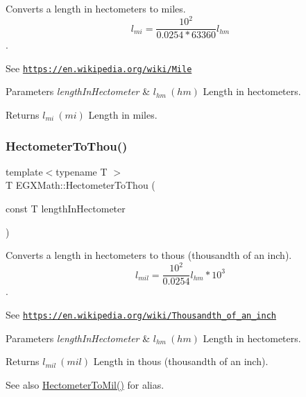 Converts a length in hectometers to miles. \[ l_{mi}=\frac{10^{2}}{0.0254 * 63360} l_{hm} \]. 

See \href{https://en.wikipedia.org/wiki/Mile}{\tt https\+://en.\+wikipedia.\+org/wiki/\+Mile} 
\begin{DoxyParams}{Parameters}
{\em length\+In\+Hectometer} & $ l_{hm}\ (hm)$ Length in hectometers. \\
\hline
\end{DoxyParams}
\begin{DoxyReturn}{Returns}
$ l_{mi}\ (mi)$ Length in miles. 
\end{DoxyReturn}
\mbox{\label{group___e_g_x_math-_conversions-_length_conversions-_hectometer-_imperial_gabfd81bd5bb9e8293005c23794f541a1c}} 
\subsubsection{\texorpdfstring{Hectometer\+To\+Thou()}{HectometerToThou()}}
{\footnotesize\ttfamily template$<$typename T $>$ \\
T E\+G\+X\+Math\+::\+Hectometer\+To\+Thou (\begin{DoxyParamCaption}\item[{const T}]{length\+In\+Hectometer }\end{DoxyParamCaption})}



Converts a length in hectometers to thous (thousandth of an inch). \[ l_{mil}= \frac{10^{2}}{0.0254} l_{hm} * 10^{3} \]. 

See \href{https://en.wikipedia.org/wiki/Thousandth_of_an_inch}{\tt https\+://en.\+wikipedia.\+org/wiki/\+Thousandth\+\_\+of\+\_\+an\+\_\+inch} 
\begin{DoxyParams}{Parameters}
{\em length\+In\+Hectometer} & $ l_{hm}\ (hm)$ Length in hectometers. \\
\hline
\end{DoxyParams}
\begin{DoxyReturn}{Returns}
$ l_{mil}\ (mil)$ Length in thous (thousandth of an inch). 
\end{DoxyReturn}
\begin{DoxySeeAlso}{See also}
\mbox{\hyperlink{group___e_g_x_math-_conversions-_length_conversions-_hectometer-_imperial_ga117bf04e7f132a33598fa098a8b7c17e}{Hectometer\+To\+Mil()}} for alias. 
\end{DoxySeeAlso}
\mbox{\label{group___e_g_x_math-_conversions-_length_conversions-_hectometer-_imperial_ga84866f087daa74cdd00348f42462d13c}} 
